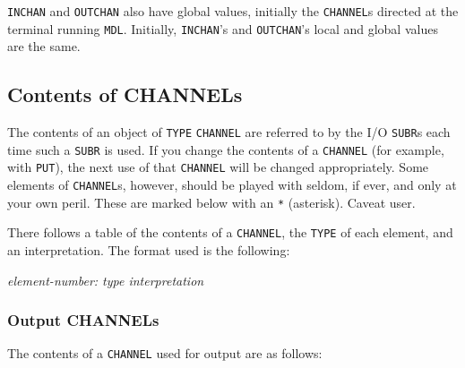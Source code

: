 \documentclass[a4paper]{scrbook}
\begin{document}
\texttt{INCHAN} and \texttt{OUTCHAN} also have global values, initially the \texttt{CHANNEL}s directed at the terminal
running \texttt{MDL}. Initially, \texttt{INCHAN}'s and \texttt{OUTCHAN}'s local and global values are the same.

\subsection{Contents of CHANNELs}\label{contents-of-channels}

The contents of an object of \texttt{TYPE} \texttt{CHANNEL}  are referred to by the I/O
\texttt{SUBR}s each time such a \texttt{SUBR} is used. If you change the contents of a \texttt{CHANNEL} (for example, with
\texttt{PUT}), the next use of that \texttt{CHANNEL} will be changed appropriately. Some elements of \texttt{CHANNEL}s,
however, should be played with seldom, if ever, and only at your own peril. These are marked below with an \texttt{*}
(asterisk). Caveat user.

There follows a table of the contents of a \texttt{CHANNEL}, the \texttt{TYPE} of each element, and an interpretation. The
format used is the following:

\emph{element-number: type interpretation}

\subsubsection{Output CHANNELs}\label{output-channels}

The contents of a \texttt{CHANNEL} used for output are as follows:
\end{document}
